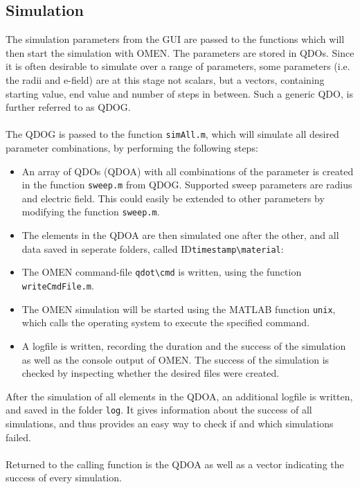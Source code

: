 			\subsection{Simulation}
				The simulation parameters from the GUI are passed to the functions which will then start the simulation with OMEN.
				The parameters are stored in QDOs. Since it is often desirable to simulate over a range of parameters, some parameters 
				(i.e. the radii and e-field) are at this stage not scalars, but a vectors, containing starting value, end value and number of steps in between. 
				Such a generic \gls{QDO},  is further referred to as \gls{QDOG}.
				\\\\
				The \gls{QDOG} is passed to the function \lstinline{simAll.m}, which will simulate all desired parameter combinations, by performing the following steps:
				\begin{itemize}
					\item An array of QDOs (QDOA) with all combinations of the parameter is created in the function \lstinline{sweep.m} from QDOG. 
					Supported sweep parameters are radius and electric field. This could easily be extended to other parameters by modifying the function \lstinline{sweep.m}.
					\item The elements in the QDOA are then simulated one after the other, and all data saved in seperate folders, called ID\lstinline{timestamp\material}: 
					\item The OMEN command-file \lstinline{qdot\cmd} is written, using the function \lstinline{writeCmdFile.m}.
					\item The OMEN simulation will be started using the MATLAB function \lstinline{unix}, which calls the operating system to execute the specified command.
					\item A logfile is written, recording the duration and the success of the simulation as well as the console output of OMEN. The success of the simulation
					is checked by inspecting whether the desired files were created.
				\end{itemize}
				After the simulation of all elements in the \gls{QDOA}, an additional logfile is written, and saved in the folder \lstinline{log}. It gives information about the 
				success of all simulations, and thus provides an easy way to check if and which simulations failed.
				\\\\
				Returned to the calling function is the \gls{QDOA} as well as a vector indicating the success of every simulation.
